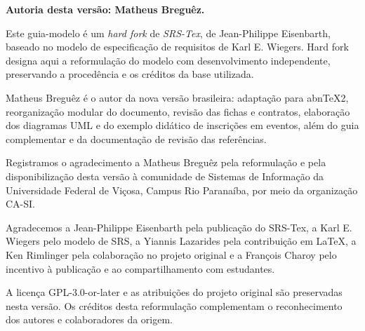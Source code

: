 
\noindent\textbf{Autoria desta versão: Matheus Breguêz.}

Este guia-modelo é um \emph{hard fork} de \emph{SRS-Tex}, de Jean-Philippe
Eisenbarth, baseado no modelo de especificação de requisitos de Karl E. Wiegers.
Hard fork designa aqui a reformulação do modelo com desenvolvimento independente,
preservando a procedência e os créditos da base utilizada.

Matheus Breguêz é o autor da nova versão brasileira: adaptação para abn\TeX2,
reorganização modular do documento, revisão das fichas e contratos, elaboração
dos diagramas UML e do exemplo didático de inscrições em eventos, além do guia
complementar e da documentação de revisão das referências.

Registramos o agradecimento a Matheus Breguêz pela reformulação e pela
disponibilização desta versão à comunidade de Sistemas de Informação da
Universidade Federal de Viçosa, Campus Rio Paranaíba, por meio da organização
CA-SI.

Agradecemos a Jean-Philippe Eisenbarth pela publicação do SRS-Tex, a Karl E.
Wiegers pelo modelo de SRS, a Yiannis Lazarides pela contribuição em LaTeX,
a Ken Rimlinger pela colaboração no projeto original e a François Charoy
pelo incentivo à publicação e ao compartilhamento com estudantes.

A licença GPL-3.0-or-later e as atribuições do projeto original são preservadas
nesta versão. Os créditos desta reformulação complementam o reconhecimento
dos autores e colaboradores da origem.
